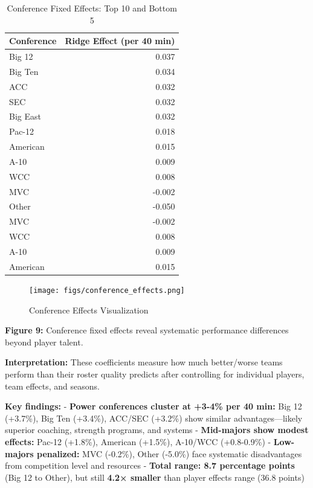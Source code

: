 \documentclass[
  letterpaper,
  DIV=11,
  numbers=noendperiod]{scrartcl}
\begin{document}
\begin{longtable}[t]{lr}
\caption{\label{tab:conference-effects-table}Conference Fixed Effects: Top 10 and Bottom 5}\\
\toprule
Conference & Ridge Effect (per 40 min)\\
\midrule
Big 12 & 0.037\\
Big Ten & 0.034\\
ACC & 0.032\\
SEC & 0.032\\
Big East & 0.032\\
\addlinespace
Pac-12 & 0.018\\
American & 0.015\\
A-10 & 0.009\\
WCC & 0.008\\
MVC & -0.002\\
\addlinespace
Other & -0.050\\
MVC & -0.002\\
WCC & 0.008\\
A-10 & 0.009\\
American & 0.015\\
\bottomrule
\end{longtable}

\begin{figure}[H]

{\centering \texttt{[image: figs/conference\_effects.png]}

}

\caption{Conference Effects Visualization}

\end{figure}%

\textbf{Figure 9:} Conference fixed effects reveal systematic
performance differences beyond player talent.

\textbf{Interpretation:} These coefficients measure how much
better/worse teams perform than their roster quality predicts after
controlling for individual players, team effects, and seasons.

\textbf{Key findings:} - \textbf{Power conferences cluster at +3-4\% per
40 min:} Big 12 (+3.7\%), Big Ten (+3.4\%), ACC/SEC (+3.2\%) show
similar advantages---likely superior coaching, strength programs, and
systems - \textbf{Mid-majors show modest effects:} Pac-12 (+1.8\%),
American (+1.5\%), A-10/WCC (+0.8-0.9\%) - \textbf{Low-majors
penalized:} MVC (-0.2\%), Other (-5.0\%) face systematic disadvantages
from competition level and resources - \textbf{Total range: 8.7
percentage points} (Big 12 to Other), but still \textbf{4.2× smaller}
than player effects range (36.8 points)
\end{document}
